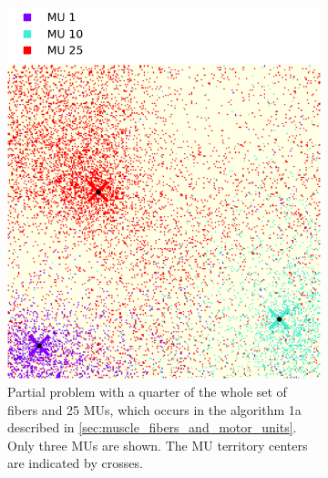 \begin{figure}
  \centering%
  \begin{subfigure}[t]{0.47\textwidth}%
    \centering%
    \includegraphics[width=\textwidth]{images/results/application/MU_fibre_distribution_523x523_100mus_txt_0_2d_fiber_distribution_.png}%
    \caption{Partial problem with a quarter of the whole set of fibers and 25 MUs, which occurs in the algorithm 1a described in \cref{sec:muscle_fibers_and_motor_units}. Only three MUs are shown. The MU territory centers are indicated by crosses.}%
    \label{fig:mu_assignment_part0}%
  \end{subfigure} \quad
  \begin{subfigure}[t]{0.47\textwidth}%
    \centering%

\end{subfigure}
\end{figure}
